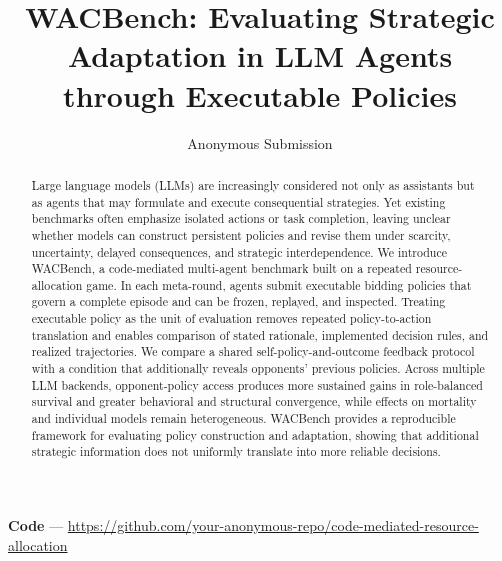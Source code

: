 \documentclass[letterpaper]{article} %
\title{WACBench: Evaluating Strategic Adaptation in LLM Agents through Executable Policies}
\author{Anonymous Submission}
\begin{document}
\maketitle


\begin{abstract}
Large language models (LLMs) are increasingly considered not only as assistants but as agents that may formulate and execute consequential strategies. Yet existing benchmarks often emphasize isolated actions or task completion, leaving unclear whether models can construct persistent policies and revise them under scarcity, uncertainty, delayed consequences, and strategic interdependence. We introduce WACBench, a code-mediated multi-agent benchmark built on a repeated resource-allocation game. In each meta-round, agents submit executable bidding policies that govern a complete episode and can be frozen, replayed, and inspected. Treating executable policy as the unit of evaluation removes repeated policy-to-action translation and enables comparison of stated rationale, implemented decision rules, and realized trajectories. We compare a shared self-policy-and-outcome feedback protocol with a condition that additionally reveals opponents' previous policies. Across multiple LLM backends, opponent-policy access produces more sustained gains in role-balanced survival and greater behavioral and structural convergence, while effects on mortality and individual models remain heterogeneous. WACBench provides a reproducible framework for evaluating policy construction and adaptation, showing that additional strategic information does not uniformly translate into more reliable decisions.
\end{abstract}
\noindent\textbf{Code} --- \url{https://github.com/your-anonymous-repo/code-mediated-resource-allocation}


\end{document}
